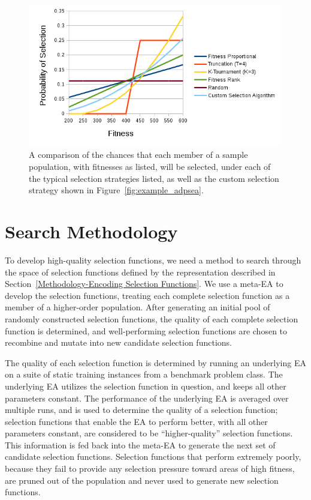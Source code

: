 \documentclass[times,12pt,titlepage]{mstogs}
\begin{document}
\begin{ThesisBody}
\begin{figure}
    \centering
    \includegraphics[width=0.99\textwidth]{selection_chances}
    \caption{A comparison of the chances that each member of a sample population, with fitnesses as listed, will be selected, under each of the typical selection strategies listed, as well as the custom selection strategy shown in Figure~\ref{fig:example_adpsea}.}
    \label{fig:selection_chances}
\end{figure}

\section{Search Methodology}
\label{Methodology-Search Methodology}

To develop high-quality selection functions, we need a method to search through the space of selection functions defined by the representation described in Section~\ref{Methodology-Encoding Selection Functions}. We use a meta-EA to develop the selection functions, treating each complete selection function as a member of a higher-order population. After generating an initial pool of randomly constructed selection functions, the quality of each complete selection function is determined, and well-performing selection functions are chosen to recombine and mutate into new candidate selection functions. 

The quality of each selection function is determined by running an underlying EA on a suite of static training instances from a benchmark problem class. The underlying EA utilizes the selection function in question, and keeps all other parameters constant. The performance of the underlying EA is averaged over multiple runs, and is used to determine the quality of a selection function; selection functions that enable the EA to perform better, with all other parameters constant, are considered to be ``higher-quality'' selection functions. This information is fed back into the meta-EA to generate the next set of candidate selection functions. Selection functions that perform extremely poorly, because they fail to provide any selection pressure toward areas of high fitness, are pruned out of the population and never used to generate new selection functions. 


\end{ThesisBody}
\end{document}
